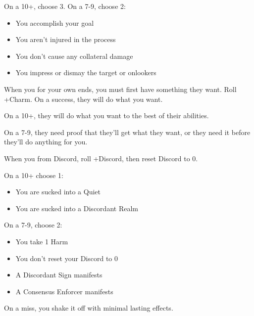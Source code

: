 \begin{multicols}{3}
\begin{move}
    On a 10+, choose 3. On a 7-9, choose 2:
    \begin{itemize}
      \setlength\itemsep{0em}
    \item You accomplish your goal
    \item You aren't injured in the process
    \item You don't cause any collateral damage
    \item You impress or dismay the target or onlookers
    \end{itemize}
  \end{move}

  \SEPARATOR

  \begin{move}
    When you  for your own ends, you must first
    have something they want. Roll +Charm. On a success, they will do
    what you want.

    On a 10+, they will do what you want to the best of their
    abilities.

    On a 7-9, they need proof that they'll get what they want, or they
    need it before they'll do anything for you.
  \end{move}

  \SEPARATOR

  \begin{move}
    When you  from Discord, roll +Discord, then reset
    Discord to 0.

    On a 10+ choose 1:
    \begin{itemize}
      \setlength\itemsep{0em}
    \item You are sucked into a Quiet
    \item You are sucked into a Discordant Realm
    \end{itemize}

    On a 7-9, choose 2:
    \begin{itemize}
      \setlength\itemsep{0em}
    \item You take 1 Harm
    \item You don't reset your Discord to 0
    \item A Discordant Sign manifests
    \item A Consensus Enforcer manifests
    \end{itemize}

    On a miss, you shake it off with minimal lasting effects.
  \end{move}

\end{multicols}

